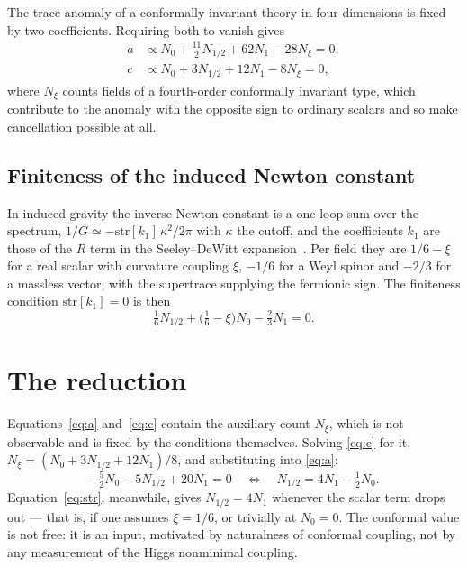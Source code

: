 \documentclass[aps,prd,twocolumn,superscriptaddress,nofootinbib,10pt]{revtex4-2}
\begin{document}
The trace anomaly of a conformally invariant theory in four dimensions is fixed by two
coefficients. Requiring both to vanish gives~\cite{NavarroSalas2024}
%
\begin{align}
  a &\propto N_0 + \tfrac{11}{2} N_{1/2} + 62 N_1 - 28 N_\xi = 0, \label{eq:a}\\
  c &\propto N_0 + 3 N_{1/2} + 12 N_1 - 8 N_\xi = 0, \label{eq:c}
\end{align}
%
where $N_\xi$ counts fields of a fourth-order conformally invariant type, which contribute to the
anomaly with the opposite sign to ordinary scalars and so make cancellation possible at all.

\subsection{Finiteness of the induced Newton constant}

In induced gravity the inverse Newton constant is a one-loop sum over the spectrum,
$1/G \simeq -\mathrm{str}[k_1]\,\kappa^2/2\pi$ with $\kappa$ the cutoff, and the coefficients $k_1$
are those of the $R$ term in the Seeley--DeWitt expansion~\cite{Visser2002,ChristensenFulling1977}.
Per field they are $1/6 - \xi$ for a real scalar with curvature coupling $\xi$, $-1/6$ for a Weyl
spinor and $-2/3$ for a massless vector, with the supertrace supplying the fermionic sign. The
finiteness condition $\mathrm{str}[k_1] = 0$ is then
%
\begin{equation}
  \tfrac{1}{6} N_{1/2} + \big(\tfrac{1}{6} - \xi\big) N_0 - \tfrac{2}{3} N_1 = 0 .
  \label{eq:str}
\end{equation}

\section{The reduction}\label{sec:reduction}

Equations~\eqref{eq:a} and~\eqref{eq:c} contain the auxiliary count $N_\xi$, which is not
observable and is fixed by the conditions themselves. Solving \eqref{eq:c} for it,
$N_\xi = (N_0 + 3N_{1/2} + 12N_1)/8$, and substituting into \eqref{eq:a}:
%
\begin{equation}
  -\tfrac{5}{2} N_0 - 5 N_{1/2} + 20 N_1 = 0
  \quad\Longleftrightarrow\quad
  N_{1/2} = 4N_1 - \tfrac{1}{2} N_0 .
  \label{eq:reduced}
\end{equation}
%
Equation~\eqref{eq:str}, meanwhile, gives $N_{1/2} = 4N_1$ whenever the scalar term drops out ---
that is, if one assumes $\xi = 1/6$, or trivially at $N_0 = 0$. The conformal value is not free: it
is an input, motivated by naturalness of conformal coupling, not by any measurement of the Higgs
nonminimal coupling.
\end{document}
